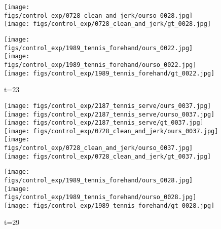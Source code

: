 \documentclass{article}
\begin{document}
\begin{appendix}
\begin{figure*}[!thbp]
\begin{subfigure}{0.12\linewidth}
  		\texttt{[image: figs/control\_exp/0728\_clean\_and\_jerk/ourso\_0028.jpg]}
  		\vspace{.2cm}
  		\texttt{[image: figs/control\_exp/0728\_clean\_and\_jerk/gt\_0028.jpg]}
  		\caption*{t=23}
  		\vspace{-7pt}
  		\texttt{[image: figs/control\_exp/1989\_tennis\_forehand/ours\_0022.jpg]}
  		\texttt{[image: figs/control\_exp/1989\_tennis\_forehand/ourso\_0022.jpg]}
  		\vspace{.2cm}
  		\texttt{[image: figs/control\_exp/1989\_tennis\_forehand/gt\_0022.jpg]}
	\end{subfigure} 
    \begin{subfigure}{0.12\linewidth}
        \caption*{t=38}
        \vspace{-7pt}
	    \texttt{[image: figs/control\_exp/2187\_tennis\_serve/ours\_0037.jpg]}
	    \texttt{[image: figs/control\_exp/2187\_tennis\_serve/ourso\_0037.jpg]}
	    \vspace{.2cm}
  		\texttt{[image: figs/control\_exp/2187\_tennis\_serve/gt\_0037.jpg]}
  		\texttt{[image: figs/control\_exp/0728\_clean\_and\_jerk/ours\_0037.jpg]}
  		\texttt{[image: figs/control\_exp/0728\_clean\_and\_jerk/ourso\_0037.jpg]}
  		\vspace{.2cm}
  		\texttt{[image: figs/control\_exp/0728\_clean\_and\_jerk/gt\_0037.jpg]}
  		\caption*{t=29}
  		\vspace{-7pt}
  		\texttt{[image: figs/control\_exp/1989\_tennis\_forehand/ours\_0028.jpg]}
  		\texttt{[image: figs/control\_exp/1989\_tennis\_forehand/ourso\_0028.jpg]}
  		\vspace{.2cm}
  		\texttt{[image: figs/control\_exp/1989\_tennis\_forehand/gt\_0028.jpg]}

\end{subfigure}
\end{figure*}
\end{appendix}
\end{document}
